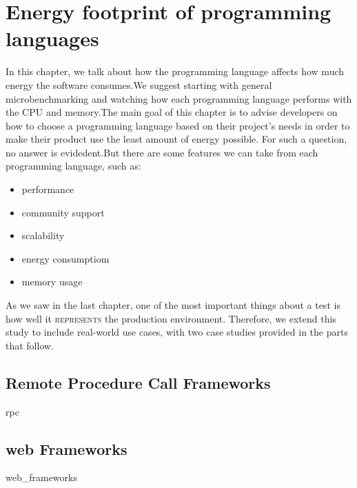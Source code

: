 \chapter{Energy footprint of programming languages}
\label{chapter:porgramming_langauges}
In this chapter, we talk about how the programming language affects how much energy the software consumes.We suggest starting with general microbenchmarking and watching how each programming language performs with the CPU and memory.The main goal of this chapter is to advise developers on how to choose a programming language based on their project's needs in order to make their product use the least amount of energy possible. For such a question, no answer is evidedent.But there are some features we can take from each programming language, such as: 
\begin{itemize}
    \item performance
    \item community support
    \item scalability
    \item energy consumptiom
    \item memory usage
\end{itemize}

As we saw in the last chapter, one of the most important things about a test is how well it \textsc{represents} the production environment. Therefore, we extend this study to include real-world use cases, with two case studies provided in the parts that follow. 
\section{Remote Procedure Call Frameworks}
{rpc}
\section{web Frameworks}
{web_frameworks}